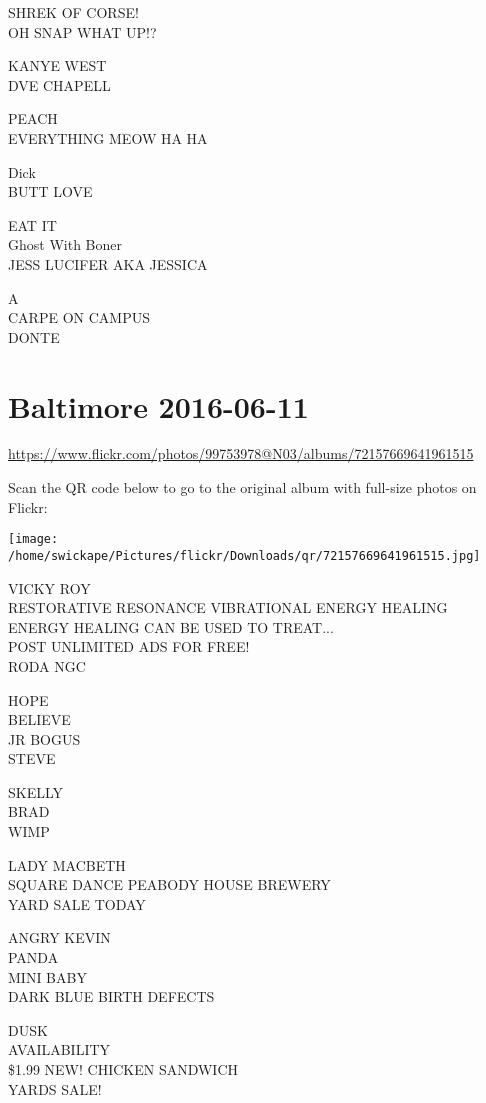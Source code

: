 \documentclass[10pt,letterpaper]{article}
\begin{document}
SHREK OF CORSE!\\
OH SNAP WHAT UP!?

KANYE WEST\\
DVE CHAPELL

PEACH\\
EVERYTHING MEOW HA HA

Dick\\
BUTT LOVE

EAT IT\\
Ghost With Boner\\
JESS LUCIFER AKA JESSICA

A\\
CARPE ON CAMPUS\\
DONTE


\section*{Baltimore 2016-06-11}

\url{https://www.flickr.com/photos/99753978@N03/albums/72157669641961515}

Scan the QR code below to go to the original album with full-size photos on Flickr:

\texttt{[image: /home/swickape/Pictures/flickr/Downloads/qr/72157669641961515.jpg]}


VICKY ROY\\
RESTORATIVE RESONANCE VIBRATIONAL ENERGY HEALING ENERGY HEALING CAN BE USED TO TREAT...\\
POST UNLIMITED ADS FOR FREE!\\
RODA NGC

HOPE\\
BELIEVE\\
JR BOGUS\\
STEVE

SKELLY\\
BRAD\\
WIMP

LADY MACBETH\\
SQUARE DANCE PEABODY HOUSE BREWERY\\
YARD SALE TODAY

ANGRY KEVIN\\
PANDA\\
MINI BABY\\
DARK BLUE BIRTH DEFECTS

DUSK\\
AVAILABILITY\\
\$1.99 NEW!  CHICKEN SANDWICH\\
YARDS SALE!
\end{document}
